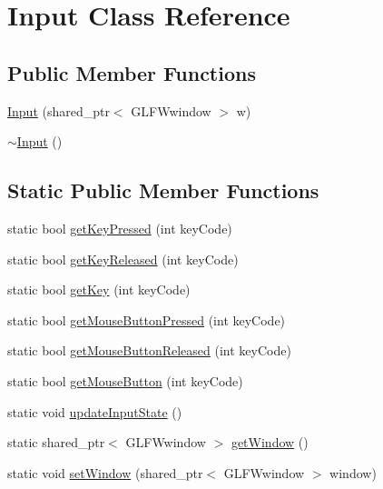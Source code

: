 \hypertarget{class_input}{}\section{Input Class Reference}
\label{class_input}
\subsection*{Public Member Functions}
\begin{DoxyCompactItemize}
\item 
\hyperlink{class_input_a4bb10af47f86a631e374d4a5d01366b4}{Input} (shared\+\_\+ptr$<$ G\+L\+F\+Wwindow $>$ w)
\item 
\hyperlink{class_input_af2db35ba67c8a8ccd23bef6a482fc291}{$\sim$\+Input} ()
\end{DoxyCompactItemize}
\subsection*{Static Public Member Functions}
\begin{DoxyCompactItemize}
\item 
static bool \hyperlink{class_input_ab424be0c858611fbd1b36f7caf80f508}{get\+Key\+Pressed} (int key\+Code)
\item 
static bool \hyperlink{class_input_a4e14edb60b254707ca85b8d1b3f1e11c}{get\+Key\+Released} (int key\+Code)
\item 
static bool \hyperlink{class_input_a60956e1f7f561d18ac47bb192d669b67}{get\+Key} (int key\+Code)
\item 
static bool \hyperlink{class_input_aecdf0f7a65f5a57d55083673a437fce6}{get\+Mouse\+Button\+Pressed} (int key\+Code)
\item 
static bool \hyperlink{class_input_a00cede6f344f2c2594428fb51534f200}{get\+Mouse\+Button\+Released} (int key\+Code)
\item 
static bool \hyperlink{class_input_a18f4658d9875dd010fad6ba27c79e6db}{get\+Mouse\+Button} (int key\+Code)
\item 
static void \hyperlink{class_input_a7a7a5adb33a1570559f5cbe173eab4c2}{update\+Input\+State} ()
\item 
static shared\+\_\+ptr$<$ G\+L\+F\+Wwindow $>$ \hyperlink{class_input_ae778fda97d821417705d50d584c9a885}{get\+Window} ()
\item 
static void \hyperlink{class_input_a713c105c3e6479947f12c018d1dec7be}{set\+Window} (shared\+\_\+ptr$<$ G\+L\+F\+Wwindow $>$ window)
\end{DoxyCompactItemize}
